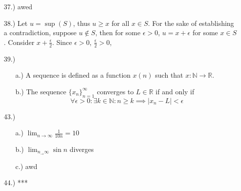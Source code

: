 \documentclass[12pt]{article}
\begin{document}
\begin{itemize}
    \item [37.)] awed

    \item [38.)] Let $u=\sup(S)$, thus $u\geq x$ for all $x\in S$. For the sake of establishing a contradiction, suppose $u\notin S$, then for some $\epsilon>0$, $u=x+\epsilon$ for some $x\in S$. Consider $x+\frac{\epsilon}{2}$. Since $\epsilon>0$, $\frac{\epsilon}{2}>0$,

    \item [39.)] \begin{itemize}
        \item [a.)] A sequence is defined as a function $x(n)$ such that $x:\mathbb{N}\rightarrow\mathbb{R}$.

        \item [b.)] The sequence $\{x_n\}^\infty_{n=1}$ converges to $L\in\mathbb{R}$ if and only if
        \[\forall\epsilon>0:\exists k\in\mathbb{N}:n\geq k\implies\vert x_n-L\vert<\epsilon\]
    \end{itemize}

    \item [43.)] \begin{itemize}
        \item [a.)] $\displaystyle\lim_{n\to\infty}\frac{1}{10n}=10$

        \item [b.)] $\displaystyle\lim_{n_\to\infty}\sin n$ diverges

        \item [c.)] awd
    \end{itemize}

    \item [44.)] ***

\end{itemize}
\end{document}
